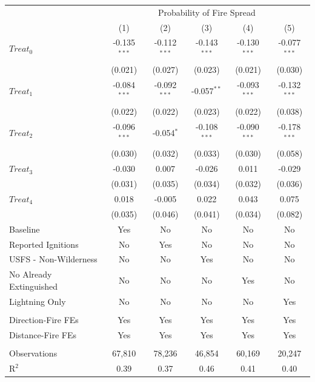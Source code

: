\begingroup
\centering
\begin{tabular}{lccccc}
   \toprule
    & \multicolumn{5}{c}{Probability of Fire Spread}\\
                           & (1)            & (2)            & (3)            & (4)            & (5)\\  
   \midrule 
   $Treat_0$               & -0.135$^{***}$ & -0.112$^{***}$ & -0.143$^{***}$ & -0.130$^{***}$ & -0.077$^{***}$\\   
                           & (0.021)        & (0.027)        & (0.023)        & (0.021)        & (0.030)\\   
   $Treat_1$               & -0.084$^{***}$ & -0.092$^{***}$ & -0.057$^{**}$  & -0.093$^{***}$ & -0.132$^{***}$\\   
                           & (0.022)        & (0.022)        & (0.023)        & (0.022)        & (0.038)\\   
   $Treat_2$               & -0.096$^{***}$ & -0.054$^{*}$   & -0.108$^{***}$ & -0.090$^{***}$ & -0.178$^{***}$\\   
                           & (0.030)        & (0.032)        & (0.033)        & (0.030)        & (0.058)\\   
   $Treat_3$               & -0.030         & 0.007          & -0.026         & 0.011          & -0.029\\   
                           & (0.031)        & (0.035)        & (0.034)        & (0.032)        & (0.036)\\   
   $Treat_4$               & 0.018          & -0.005         & 0.022          & 0.043          & 0.075\\   
                           & (0.035)        & (0.046)        & (0.041)        & (0.034)        & (0.082)\\   
   Baseline                & Yes            & No             & No             & No             & No\\  
   Reported Ignitions      & No             & Yes            & No             & No             & No\\  
   USFS - Non-Wilderness   & No             & No             & Yes            & No             & No\\  
   No Already Extinguished & No             & No             & No             & Yes            & No\\  
   Lightning Only          & No             & No             & No             & No             & Yes\\  
    \\
   Direction-Fire FEs      & Yes            & Yes            & Yes            & Yes            & Yes\\  
   Distance-Fire FEs       & Yes            & Yes            & Yes            & Yes            & Yes\\  
    \\
   Observations            & 67,810         & 78,236         & 46,854         & 60,169         & 20,247\\  
   R$^2$                   & 0.39           & 0.37           & 0.46           & 0.41           & 0.40\\  
   \bottomrule
\end{tabular}
\par\endgroup
